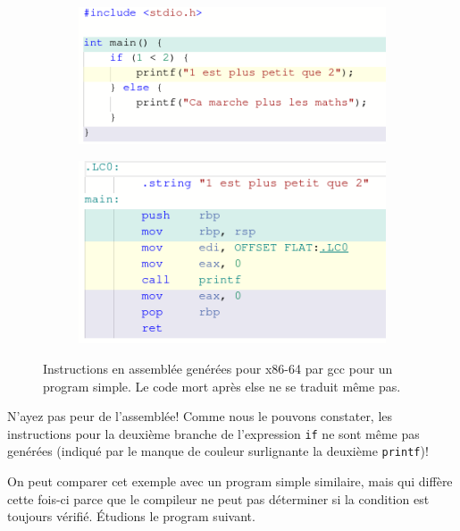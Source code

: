 \documentclass[11pt]{article} %
\begin{document}
\begin{figure}[h!]
    \centering
    \begin{subfigure}[h!]{0.4\textwidth}
        \includegraphics[width=\linewidth]{media/dce_left.png}
    \end{subfigure}
    \begin{subfigure}[h!]{0.4\textwidth}
        \includegraphics[width=\linewidth]{media/dce-right.png}
    \end{subfigure}
    \caption{Instructions en assembl\'ee gen\'er\'ees pour x86-64 par gcc pour un program simple. Le code mort après else ne se traduit même pas.}
\end{figure}
N'ayez pas peur de l'assembl\'ee! Comme nous le pouvons constater, les instructions pour la deuxi\`eme branche de l'expression \verb|if| ne sont m\^eme
pas gen\'er\'ees (indiqu\'e par le manque de couleur surlignante la deuxième \verb|printf|)!

On peut comparer cet exemple avec un program simple similaire, mais qui diff\`ere cette fois-ci parce que le compileur ne peut pas d\'eterminer si la condition
est toujours v\'erifi\'e. \'Etudions le program suivant.
\end{document}
